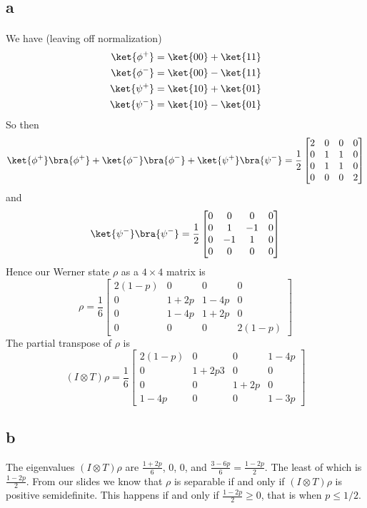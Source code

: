 \documentclass[letterpaper,12pt,oneside,onecolumn]{article}
\begin{document}
\section{}
\subsection{a}
\paragraph{}
We have (leaving off normalization)
\begin{align*}
\ket{\phi^+} &= \ket{00} + \ket{11}\\
\ket{\phi^-} &= \ket{00} - \ket{11} \\
\ket{\psi^+} &= \ket{10} + \ket{01} \\
\ket{\psi^-} &= \ket{10} - \ket{01}
\end{align*}
So then
$$\ket{\phi^+}\bra{\phi^+} + \ket{\phi^-}\bra{\phi^-} + \ket{\psi^+}\bra{\psi^-} = \frac{1}{2}\begin{bmatrix}
2 & 0 & 0 &0 \\
0 & 1 & 1 & 0 \\
0 & 1 & 1 & 0 \\
0 &0 &0 &2
\end{bmatrix}$$
and 
$$\ket{\psi^-}\bra{\psi^-} =\frac{1}{2} \begin{bmatrix}
0 & 0 &0 & 0\\
0 & 1 & -1 & 0 \\
0 & -1 & 1 & 0 \\
0 &0 &0 &0
\end{bmatrix}$$
Hence our Werner state $\rho$ as a $4\times 4$ matrix is
$$\rho = \frac{1}{6}\begin{bmatrix}
2(1-p) & 0 & 0 &0 \\
0 & 1+2p & 1-4p & 0 \\
0 & 1-4p & 1+2p & 0 \\
0 & 0 & 0 & 2(1-p)
\end{bmatrix}$$
The partial transpose of $\rho$ is 
$$(I \otimes T)\rho = \frac{1}{6}\begin{bmatrix}
2(1-p) & 0 & 0 &1-4p \\
0 & 1+2p3 & 0 & 0 \\
0 & 0 & 1+2p & 0 \\
1-4p & 0 & 0 & 1-3p
\end{bmatrix}$$
\subsection{b}
The eigenvalues $(I \otimes T)\rho$ are $\frac{1+2p}{6}$, $0$, $0$, and $\frac{3-6p}{6} = \frac{1-2p}{2}$. The least of which is $\frac{1-2p}{2}$. From our slides we know that $\rho$ is separable if and only if $(I \otimes T)\rho$ is positive semidefinite. This happens if and only if $\frac{1-2p}{2} \geq 0$, that is when $p \leq 1/2$.
\newpage
\end{document}
